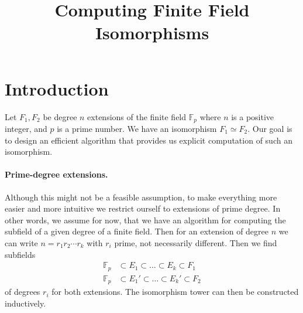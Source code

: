 \documentclass[12pt]{article}
\title{Computing Finite Field Isomorphisms}
\date{}
\theoremstyle{plain}
\theoremstyle{definition}
\def\F{\mathbb{F}}
\newcounter{algorithm}
\begin{document}
\maketitle
\tableofcontents

\section{Introduction}

Let $F_1, F_2$ be degree $n$ extensions of the finite field $\F_p$ where $n$ is a positive integer, and $p$ is a prime number. We have an isomorphism $F_1 \simeq F_2$. Our goal is to design an efficient algorithm that provides us explicit computation of such an isomorphism.

\paragraph{Prime-degree extensions.} Although this might not be a feasible assumption, to make everything more easier and more intuitive we 
restrict ourself to extensions of prime degree. In other words, we assume for now, that we have an algorithm for computing the subfield of a given degree of a finite field. Then for an extension of degree $n$ we can write $n = r_1r_2\cdots r_k$ with $r_i$ prime, not necessarily different. Then we find subfields 
\begin{align*}
	\F_p & \subset E_1 \subset \ldots \subset E_k \subset F_1 \\
	\F_p & \subset E_1' \subset \ldots \subset E_k' \subset F_2
\end{align*}
of degrees $r_i$ for both extensions. The isomorphism tower can then be constructed inductively. 
\end{document}
